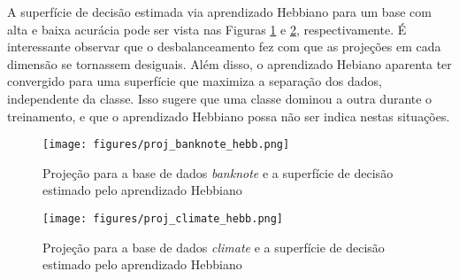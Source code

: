 \documentclass[conference]{IEEEtran}
\begin{document}
	A superfície de decisão estimada via aprendizado Hebbiano para um base com alta e baixa acurácia pode ser vista nas Figuras \ref{fig:proj_banknote} e \ref{fig:proj_climate}, respectivamente. É interessante observar que o desbalanceamento fez com que as projeções em cada dimensão se tornassem desiguais. Além disso, o aprendizado Hebiano aparenta ter convergido para uma superfície que maximiza a separação dos dados, independente da classe. Isso sugere que uma classe dominou a outra durante o treinamento, e que o aprendizado Hebbiano possa não ser indica nestas situações.  
	
	\begin{figure}[thpbh]
		\centering
		\texttt{[image: figures/proj\_banknote\_hebb.png]}
		\caption{Projeção para a base de dados \textit{banknote} e a superfície de decisão estimado pelo aprendizado Hebbiano}
		\label{fig:proj_banknote}
	\end{figure}
	\begin{figure}[thpbh]
		\centering
		\texttt{[image: figures/proj\_climate\_hebb.png]}
		\caption{Projeção para a base de dados \textit{climate} e a superfície de decisão estimado pelo aprendizado Hebbiano}
		\label{fig:proj_climate}
	\end{figure}
	
\end{document}
